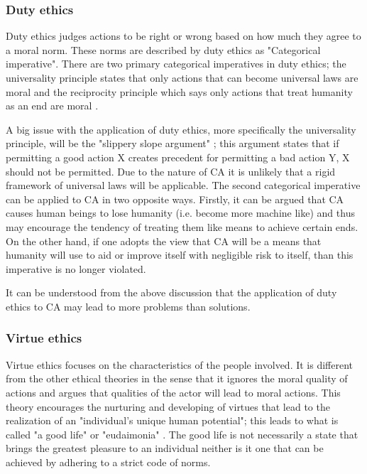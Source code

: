 
\subsubsection{Duty ethics}

Duty ethics judges actions to be right or wrong based on how much they agree to a moral norm. These norms are described by duty ethics as "Categorical imperative". There are two primary categorical imperatives in duty ethics; the universality principle states that only actions that can become universal laws are moral\cite[ch. 3.8]{Ethics_textbook} and the reciprocity principle which says only actions that treat humanity as an end are moral \cite[ch. 3.8]{Ethics_textbook}.

A big issue with the application of duty ethics, more specifically the universality principle, will be the "slippery slope argument" \cite{van1991slippery,resnik1994debunking}; this argument states that if permitting a good action X creates precedent for permitting a bad action Y, X should not be permitted. Due to the nature of CA it is unlikely that a rigid framework of universal laws will be applicable. The second categorical imperative can be applied to CA in two opposite ways. Firstly, it can be argued that CA causes human beings to lose humanity (i.e. become more machine like) and thus may encourage the tendency of treating them like means to achieve certain ends. On the other hand, if one adopts the view that CA will be a means that humanity will use to aid or improve itself with negligible risk to itself, than this imperative is no longer violated.

It can be understood from the above discussion that the application of duty ethics to CA may lead to more problems than solutions.

\subsubsection{Virtue ethics}

Virtue ethics focuses on the characteristics of the people involved. It is different from the other ethical theories in the sense that it ignores the moral quality of actions and argues that qualities of the actor will lead to moral actions. This theory encourages the nurturing and developing of virtues that lead to the realization of an "individual's unique human potential"; this leads to what is called "a good life" or "eudaimonia" \cite[ch. 3.9]{Ethics_textbook}. The good life is not necessarily a state that brings the greatest pleasure to an individual neither is it one that can be achieved by adhering to a strict code of norms.

